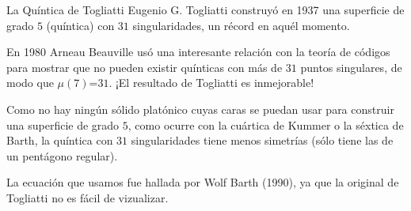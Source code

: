 \begin{surferPage}{La Quíntica de Togliatti}
    Eugenio G. Togliatti construyó en 1937 una superficie de grado $5$ (quíntica)
    con $31$ singularidades, un récord en aquél momento.

    En 1980 Arneau Beauville usó una interesante relación con la teoría de códigos 
    para mostrar que no pueden existir quínticas con más de $31$ puntos singulares,
    de modo que $\mu(7)$=$31$. ¡El resultado de Togliatti es inmejorable!
    
    Como no hay ningún sólido platónico cuyas caras se puedan usar para construir una 
    superficie de grado $5$, como ocurre con la cuártica de Kummer o la séxtica de Barth, 
    la quíntica con $31$ singularidades tiene menos simetrías (sólo tiene las de un pentágono regular).

 La ecuación que usamos fue hallada por Wolf Barth (1990), ya que la original de Togliatti no es fácil de vizualizar.
\end{surferPage}
